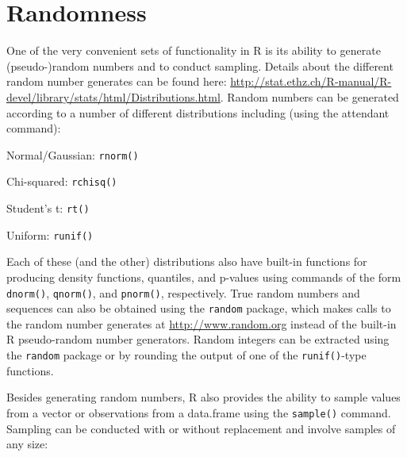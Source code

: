 \documentclass[12pt]{article}\usepackage[]{graphicx}\usepackage[]{color}
\begin{document}
\section{Randomness}\label{sec:random}

One of the very convenient sets of functionality in R is its ability to generate (pseudo-)random numbers and to conduct sampling. Details about the different random number generates can be found here: \url{http://stat.ethz.ch/R-manual/R-devel/library/stats/html/Distributions.html}. Random numbers can be generated according to a number of different distributions including (using the attendant command):
\begin{itemize*}
\item Normal/Gaussian: \texttt{rnorm()}
\item Chi-squared: \texttt{rchisq()}
\item Student's t: \texttt{rt()}
\item Uniform: \texttt{runif()}
\end{itemize*}

Each of these (and the other) distributions also have built-in functions for producing density functions, quantiles, and p-values using commands of the form \texttt{dnorm()}, \texttt{qnorm()}, and \texttt{pnorm()}, respectively. True random numbers and sequences can also be obtained using the \texttt{random} package, which makes calls to the random number generates at \url{http://www.random.org} instead of the built-in R pseudo-random number generators. Random integers can be extracted using the \texttt{random} package or by rounding the output of one of the \texttt{runif()}-type functions.

Besides generating random numbers, R also provides the ability to sample values from a vector or observations from a data.frame using the \texttt{sample()} command. Sampling can be conducted with or without replacement and involve samples of any size:
\end{document}

